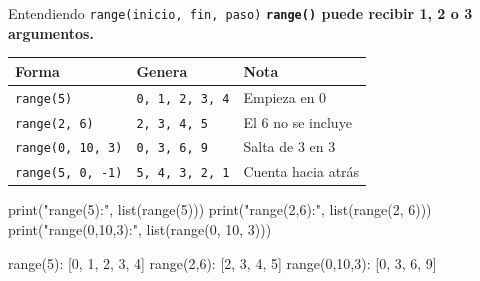 \documentclass[aspectratio=169, 11pt]{beamer}
\begin{document}
\begin{frame}[fragile,shrink=30]{Entendiendo \texttt{range(inicio, fin, paso)}}
  \vspace{-6pt}
  {\small\color{arcaDark}\bfseries
    \texttt{range()} puede recibir 1, 2 o 3 argumentos.}

  \vspace{4pt}
  {\footnotesize
  \renewcommand{\arraystretch}{1.3}
  \begin{tabular}{@{}l l l@{}}
    \toprule
    {\bfseries\color{arcaDark} Forma} &
    {\bfseries\color{arcaDark} Genera} &
    {\bfseries\color{arcaDark} Nota} \\
    \midrule
    \texttt{range(5)}        & \texttt{0, 1, 2, 3, 4}  & Empieza en 0 \\
    \texttt{range(2, 6)}     & \texttt{2, 3, 4, 5}     & El 6 no se incluye \\
    \texttt{range(0, 10, 3)} & \texttt{0, 3, 6, 9}     & Salta de 3 en 3 \\
    \texttt{range(5, 0, -1)} & \texttt{5, 4, 3, 2, 1}  & Cuenta hacia atrás \\
    \bottomrule
  \end{tabular}
  }

  \vspace{6pt}
  \begin{pyblock}
print("range(5):", list(range(5)))
print("range(2,6):", list(range(2, 6)))
print("range(0,10,3):", list(range(0, 10, 3)))
  \end{pyblock}
  \vspace{-2pt}
  \begin{outputblock}
range(5): [0, 1, 2, 3, 4]
range(2,6): [2, 3, 4, 5]
range(0,10,3): [0, 3, 6, 9]
  \end{outputblock}
\end{frame}
\end{document}
